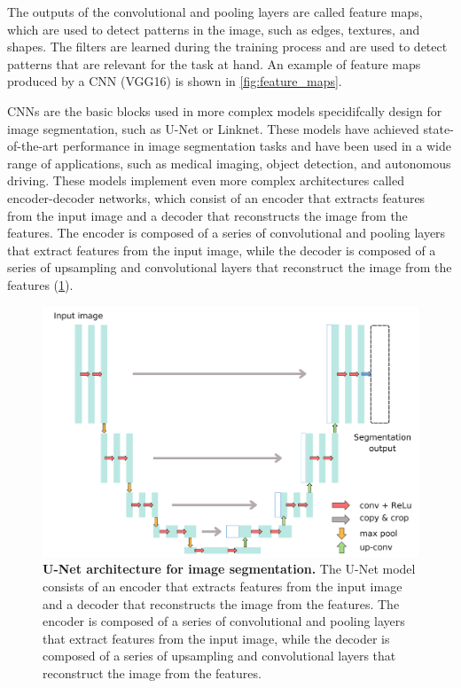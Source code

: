 The outputs of the convolutional and pooling layers are called feature maps,
which are used to detect patterns in the image, such as edges, textures, and
shapes. The filters are learned during the training process and are used to
detect patterns that are relevant for the task at hand. An example of feature
maps produced by a CNN (VGG16) is shown in \cref{fig:feature_maps}.

CNNs are the basic blocks used in more complex models specidifcally design for
image segmentation, such as U-Net or Linknet. These models have achieved
state-of-the-art performance in image segmentation tasks and have been used in
a wide range of applications, such as medical imaging, object detection, and
autonomous driving. These models implement even more complex architectures
called encoder-decoder networks, which consist of an encoder that extracts
features from the input image and a decoder that reconstructs the image from
the features. The encoder is composed of a series of convolutional and pooling
layers that extract features from the input image, while the decoder is
composed of a series of upsampling and convolutional layers that reconstruct
the image from the features (\cref{fig:Unet}).

\begin{figure}[H]
  \centering
  \includegraphics[width=1\textwidth]{Figures/Unet.pdf}
  \caption[U-Net architecture for image segmentation]{
    \textbf{U-Net architecture for image segmentation.} The U-Net model
    consists of an encoder that extracts features from the input image and a
    decoder that reconstructs the image from the features. The encoder is
    composed of a series of convolutional and pooling layers that extract
    features from the input image, while the decoder is composed of a series of
    upsampling and convolutional layers that reconstruct the image from the
    features.}
  \label{fig:Unet}
\end{figure}

